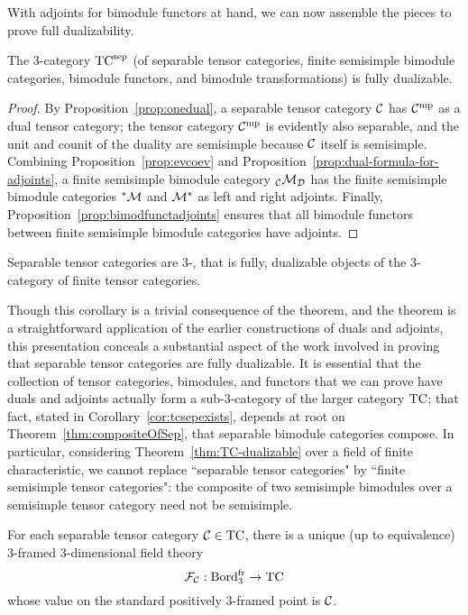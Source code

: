 \documentclass{amsart}
\begin{document}
With adjoints for bimodule functors at hand, we can now assemble the pieces to prove full dualizability.
\begin{theorem} \label{thm:TC-dualizable}
The 3-category ${\mathrm{TC}^{\mathrm{sep}}}$ (of separable tensor categories, finite semisimple bimodule categories, bimodule functors, and bimodule transformations) is fully dualizable.
\end{theorem}
\begin{proof}
By Proposition~\ref{prop:onedual}, a separable tensor category $\mathcal C$ has $\mathcal C^{\mathrm{mp}}$ as a dual tensor category; the tensor category $\mathcal C^{\mathrm{mp}}$ is evidently also separable, and the unit and counit of the duality are semisimple because $\mathcal C$ itself is semisimple.  Combining Proposition~\ref{prop:evcoev} and Proposition~\ref{prop:dual-formula-for-adjoints}, a finite semisimple bimodule category ${}_\mathcal C \mathcal M_\mathcal D$ has the finite semisimple bimodule categories ${}^* \mathcal M$ and $\mathcal M^*$ as left and right adjoints.  Finally, Proposition~\ref{prop:bimodfunctadjoints} ensures that all bimodule functors between finite semisimple bimodule categories have adjoints.
\end{proof}

\begin{corollary} \label{cor:septcisdualizable}
Separable tensor categories are 3-, that is fully, dualizable objects of the 3-category of finite tensor categories.
\end{corollary}

\begin{remark}
Though this corollary is a trivial consequence of the theorem, and the theorem is a straightforward application of the earlier constructions of duals and adjoints, this presentation conceals a substantial aspect of the work involved in proving that separable tensor categories are fully dualizable.  It is essential that the collection of tensor categories, bimodules, and functors that we can prove have duals and adjoints actually form a sub-3-category of the larger category $\mathrm{TC}$; that fact, stated in Corollary~\ref{cor:tcsepexists}, depends at root on Theorem~\ref{thm:compositeOfSep}, that separable bimodule categories compose.  In particular, considering Theorem~\ref{thm:TC-dualizable} over a field of finite characteristic, we cannot replace ``separable tensor categories" by ``finite semisimple tensor categories": the composite of two semisimple bimodules over a semisimple tensor category need not be semisimple.
\end{remark}

\begin{corollary} \label{cor:3dtft}
For each separable tensor category $\mathcal C \in \mathrm{TC}$, there is a unique (up to equivalence) 3-framed 3-dimensional field theory
\[
\mathcal F_\mathcal C : \mathrm{Bord}^\mathrm{fr}_3 \rightarrow \mathrm{TC}
\]
whose value on the standard positively 3-framed point is $\mathcal C$.
\end{corollary}
\end{document}
